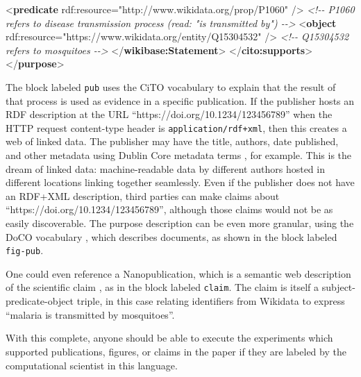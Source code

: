 \documentclass[manuscript,authordraft]{acmart}
\newenvironment{Shaded}{}{}
\newcommand{\CommentTok}[1]{\textcolor[rgb]{0.38,0.63,0.69}{\textit{#1}}}
\newcommand{\KeywordTok}[1]{\textcolor[rgb]{0.00,0.44,0.13}{\textbf{#1}}}
\newcommand{\NormalTok}[1]{#1}
\newcommand{\OtherTok}[1]{\textcolor[rgb]{0.00,0.44,0.13}{#1}}
\newcommand{\StringTok}[1]{\textcolor[rgb]{0.25,0.44,0.63}{#1}}
\begin{document}
\begin{Shaded}
\begin{Highlighting}[]
\NormalTok{      \textless{}}\KeywordTok{predicate}\OtherTok{ rdf:resource=}\StringTok{"http://www.wikidata.org/prop/P1060"}\NormalTok{ /\textgreater{} }\CommentTok{\textless{}!{-}{-} P1060 refers to disease transmission process (read: "is transmitted by") {-}{-}\textgreater{}}
\NormalTok{      \textless{}}\KeywordTok{object}\OtherTok{ rdf:resource=}\StringTok{"https://www.wikidata.org/entity/Q15304532"}\NormalTok{ /\textgreater{} }\CommentTok{\textless{}!{-}{-} Q15304532 refers to mosquitoes {-}{-}\textgreater{}}
\NormalTok{    \textless{}/}\KeywordTok{wikibase:Statement}\NormalTok{\textgreater{}}
\NormalTok{  \textless{}/}\KeywordTok{cito:supports}\NormalTok{\textgreater{}}
\NormalTok{\textless{}/}\KeywordTok{purpose}\NormalTok{\textgreater{}}
\end{Highlighting}
\end{Shaded}

\normalsize

The block labeled \texttt{pub} uses the CiTO vocabulary
\cite{shotton_cito_2010} to explain that the result of that process is
used as evidence in a specific publication. If the publisher hosts an
RDF description at the URL ``https://doi.org/10.1234/123456789'' when
the HTTP request content-type header is \texttt{application/rdf+xml},
then this creates a web of linked data. The publisher may have the
title, authors, date published, and other metadata using Dublin Core
metadata terms \cite{weibel_dublin_2000}, for example. This is the dream
of linked data: machine-readable data by different authors hosted in
different locations linking together seamlessly. Even if the publisher
does not have an RDF+XML description, third parties can make claims
about ``https://doi.org/10.1234/123456789'', although those claims would
not be as easily discoverable. The purpose description can be even more
granular, using the DoCO vocabulary \cite{constantin_document_2016},
which describes documents, as shown in the block labeled
\texttt{fig-pub}.

One could even reference a Nanopublication, which is a semantic web
description of the scientific claim \cite{groth_anatomy_2010}, as in the
block labeled \texttt{claim}. The claim is itself a
subject-predicate-object triple, in this case relating identifiers from
Wikidata \cite{erxleben_introducing_2014} to express ``malaria is
transmitted by mosquitoes''.

With this complete, anyone should be able to execute the experiments
which supported publications, figures, or claims in the paper if they
are labeled by the computational scientist in this language.
\end{document}

